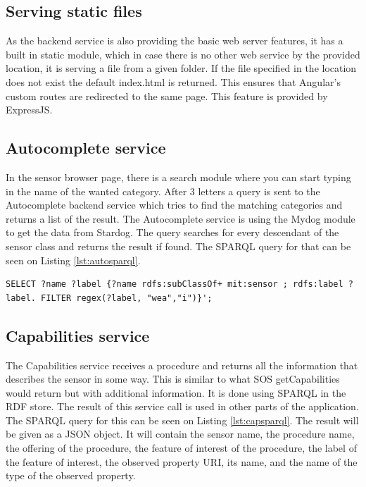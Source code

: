 \subsection{Serving static files}
As the backend service is also providing the basic web server features, it has a built in static module, which in case there is no other web service by the provided location, it is serving a file from a given folder. If the file specified in the location does not exist the default index.html is returned. 
This ensures that Angular's custom routes are redirected to the same page. This feature is provided by ExpressJS.

\subsection{Autocomplete service}
In the sensor browser page, there is a search module where you can start typing in the name of the wanted category. After 3 letters a query is sent to the Autocomplete backend service which tries to find the matching categories and returns a list of the result. The Autocomplete service is using the Mydog module to get the data from Stardog. 
The query searches for every descendant of the sensor class and returns the result if found. The SPARQL query for that can be seen on Listing \ref{lst:autosparql}. 
\begin{lstlisting}[caption={SPARQL query for Autocomplete on the "wea" string\label{lst:autosparql}}]
SELECT ?name ?label {?name rdfs:subClassOf+ mit:sensor ; rdfs:label ?label. FILTER regex(?label, "wea","i")}';
\end{lstlisting}

\subsection{Capabilities service}
The Capabilities service receives a procedure and returns all the information that describes the sensor in some way. This is similar to what SOS getCapabilities would return but with additional information. It is done using SPARQL in the RDF store. The result of this service call is used in other parts of the application. The SPARQL query for this can be seen on Listing \ref{lst:capsparql}. The result will be given as a JSON object. It will contain the sensor name, the procedure name, the offering of the procedure, the feature of interest of the procedure, the label of the feature of interest, the observed property URI, its name, and the name of the type of the observed property. 


